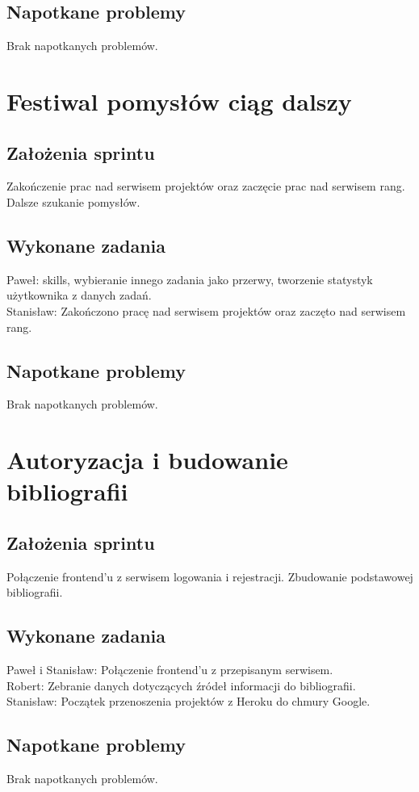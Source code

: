 \documentclass[a4paper,11pt]{report}
\begin{document}
\subsection {Napotkane problemy}
Brak napotkanych problemów.

\section {Festiwal pomysłów ciąg dalszy}
\subsection {Założenia sprintu}
Zakończenie prac nad serwisem projektów oraz zaczęcie prac nad serwisem rang. Dalsze szukanie pomysłów.
\subsection {Wykonane zadania}
Paweł: skills, wybieranie innego zadania jako przerwy, tworzenie statystyk użytkownika z danych zadań.\\
Stanisław: Zakończono pracę nad serwisem projektów oraz zaczęto nad serwisem rang.\\
\subsection {Napotkane problemy}
Brak napotkanych problemów.

\section {Autoryzacja i budowanie bibliografii}
\label{sec:system_autoryzacji_uzytkownika}
\subsection {Założenia sprintu}
Połączenie frontend'u z serwisem logowania i rejestracji. Zbudowanie podstawowej bibliografii.
\subsection {Wykonane zadania}
Paweł i Stanisław: Połączenie frontend'u z przepisanym serwisem.\\
Robert: Zebranie danych dotyczących źródeł informacji do bibliografii.\\
Stanisław: Początek przenoszenia projektów z Heroku do chmury Google.\\
\subsection {Napotkane problemy}
Brak napotkanych problemów.
\end{document}
